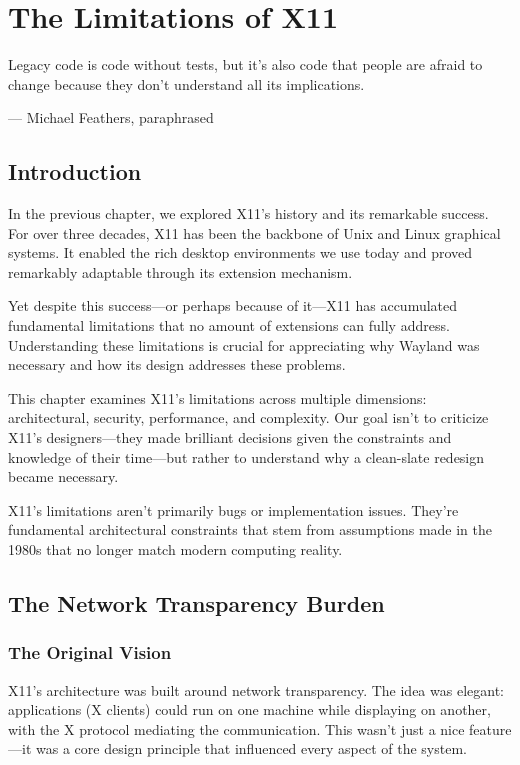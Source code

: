 \chapter{The Limitations of X11}
\label{ch:limitations-of-x11}

\epigraph{Legacy code is code without tests, but it's also code that people are afraid to change because they don't understand all its implications.}{--- Michael Feathers, paraphrased}

\section{Introduction}

In the previous chapter, we explored X11's history and its remarkable success. For over three decades, X11 has been the backbone of Unix and Linux graphical systems. It enabled the rich desktop environments we use today and proved remarkably adaptable through its extension mechanism.

Yet despite this success—or perhaps because of it—X11 has accumulated fundamental limitations that no amount of extensions can fully address. Understanding these limitations is crucial for appreciating why Wayland was necessary and how its design addresses these problems.

This chapter examines X11's limitations across multiple dimensions: architectural, security, performance, and complexity. Our goal isn't to criticize X11's designers—they made brilliant decisions given the constraints and knowledge of their time—but rather to understand why a clean-slate redesign became necessary.

\begin{importantbox}
X11's limitations aren't primarily bugs or implementation issues. They're fundamental architectural constraints that stem from assumptions made in the 1980s that no longer match modern computing reality.
\end{importantbox}

\section{The Network Transparency Burden}

\subsection{The Original Vision}

X11's architecture was built around network transparency. The idea was elegant: applications (X clients) could run on one machine while displaying on another, with the X protocol mediating the communication. This wasn't just a nice feature—it was a core design principle that influenced every aspect of the system.

